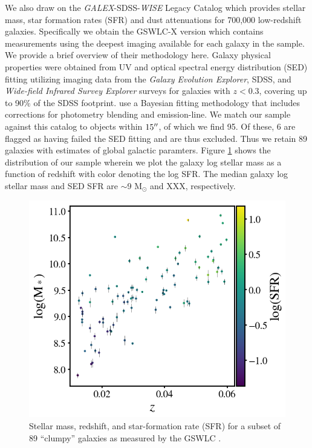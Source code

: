 We also draw on the \textit{GALEX}-SDSS-\textit{WISE} Legacy Catalog \citep[GSWLC,][]{Salim2016} which provides stellar mass, star formation rates (SFR) and dust attenuations for 700,000 low-redshift galaxies. Specifically we obtain the GSWLC-X version which contains measurements using the deepest imaging available for each galaxy in the sample. We provide a brief overview of their methodology here.  Galaxy physical properties were obtained from UV and optical spectral energy distribution (SED) fitting utilizing imaging data from the \textit{Galaxy Evolution Explorer}, SDSS, and \textit{Wide-field Infrared Survey Explorer} surveys for galaxies with $z<0.3$, covering up to 90\% of the SDSS footprint. \cite{Salim2016} use a Bayesian fitting methodology that includes corrections for photometry blending and emission-line.  We match our sample against this catalog to objects within $15\mbox{$^{\prime\prime}$}$, of which we find 95. Of these, 6 are flagged as having failed the SED fitting and are thus excluded. Thus we retain 89 galaxies with estimates of global galactic paramters. Figure \ref{fig: clumpy gswlc properties} shows the distribution of our sample wherein we plot the galaxy log stellar mass as a function of redshift with color denoting the log SFR. The median galaxy log stellar mass and SED SFR are $\sim$9 M$_{\odot}$ and XXX, respectively. 

\begin{figure}
\centering
\includegraphics[width=5in]{Figures/mass_z_sfr.png}
\caption[Stellar mass, redshift, and Star-formation rate for a subset of our ``clumpy'' galaxies as measured by the GSWLC.]{Stellar mass, redshift, and star-formation rate (SFR) for a subset of 89 ``clumpy'' galaxies as measured by the GSWLC \citep{Salim2016}.}
\label{fig: clumpy gswlc properties}
\end{figure}

